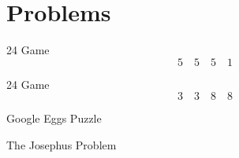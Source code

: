 \section{Problems}

\begin{frame}{24 Game}
  \[
    5 \quad 5 \quad 5 \quad 1
  \]
\end{frame}

\begin{frame}{24 Game}
  \[
    3 \quad 3 \quad 8 \quad 8 
  \]
\end{frame}

\begin{frame}{Google Eggs Puzzle}
\end{frame}

\begin{frame}{The Josephus Problem}
\end{frame}